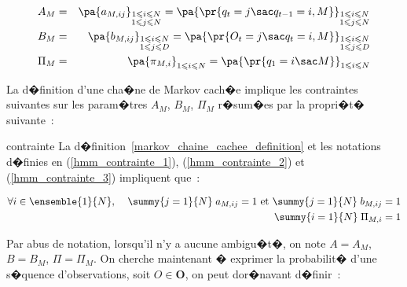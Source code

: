         \begin{eqnarray*}
        A_M    &=& \pa {  a_{M,ij} } _ {\substack{ 1\leqslant i\leqslant N\\1\leqslant j\leqslant N}} =
                   \pa{ \pr {  q_{t}=j \sac  q_{t-1} =i,M } } _{\substack{1\leqslant i\leqslant N\\1\leqslant j\leqslant N}}
                    \label{hmm_contrainte_1}\\
        B_M    &=& \pa{   b_{M,ij} } _ {\substack{1\leqslant i\leqslant N\\1\leqslant j\leqslant D}}=
                   \pa { \pr{ O_{t}=j \sac  q_{t}=i,M } }     _ {\substack{1\leqslant i\leqslant N\\1\leqslant j\leqslant D}}
                    \label{hmm_contrainte_2}\\
        \Pi_M  &=& \pa { \pi_{M,i} } _ { 1 \leqslant i \leqslant N } = \pa { \pr {  q_1 = i \sac M} } _ { 1 \leqslant i \leqslant N }
                             \label{hmm_contrainte_3}
        \end{eqnarray*}


La d�finition d'une cha�ne de Markov cach�e implique les contraintes suivantes sur les param�tres $A_M$, $B_M$, $\Pi_M$
r�sum�es par la propri�t� suivante~:


        \begin{xproperty}{contrainte}
        \label{propriete_mmc_contrainte}%
        La d�finition~\ref{markov_chaine_cachee_definition} et les notations d�finies en (\ref{hmm_contrainte_1}),
        (\ref{hmm_contrainte_2}) et (\ref{hmm_contrainte_3}) impliquent que~:
        
                \begin{eqnarray*}
                \forall i\in \ensemble{1}{N}, \; &&\summy{j=1}{N} \; a_{M,ij}=1 \text{ et }
                                                                                    \summy{j=1}{N} \; b_{M,ij}=1 \\
                                                 &&\summy{i=1}{N} \; \Pi_{M,i} = 1
                \end{eqnarray*}
        \end{xproperty}


Par abus de notation, lorsqu'il n'y a aucune ambigu�t�, on note $A=A_M$, $B=B_M$, $\Pi=\Pi_M$. On cherche maintenant � exprimer la probabilit� d'une s�quence d'observations, soit $O \in \mathbf{O}$, on peut dor�navant d�finir~:


